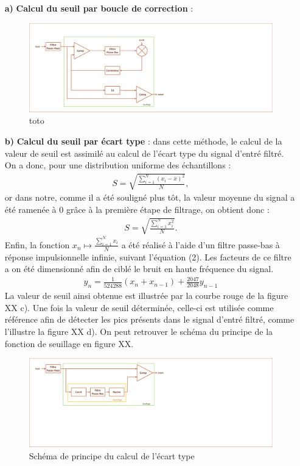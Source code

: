 \documentclass[a4paper,12pt]{article}
\begin{document}
\begin{itemize}
\begin{itemize}
\item[\textbf{a)}] \textbf{Calcul du seuil par boucle de correction} :
\begin{figure}[H]
\centering
\includegraphics[width=\textwidth, keepaspectratio]{chainCedric.pdf}
\caption{toto}
\end{figure}
\item[\textbf{b)}] \textbf{Calcul du seuil par écart type} : dans cette méthode, le calcul de la valeur de seuil est assimilé au calcul de l'écart type du signal d'entré filtré. On a donc, pour une distribution uniforme des échantillons :
\begin{eqnarray*}
S = \sqrt{\frac{\sum^N_{i=1}\left(x_i-\overline{x}\right)^2}{N}},
\end{eqnarray*}
or dans notre, comme il a été souligné plus tôt, la valeur moyenne du signal a été ramenée à 0 grâce à la première étape de filtrage, on obtient donc :
\begin{eqnarray*}
S = \sqrt{\frac{\sum^N_{i=1}x_i^2}{N}}.
\end{eqnarray*}
Enfin, la fonction $x_n\mapsto\frac{\sum^N_{i=1}x_i}{N}$ a été réalisé à l'aide d'un filtre passe-bas à réponse impulsionnelle infinie, suivant l'équation (2). Les facteurs de ce filtre a on été dimensionné afin de ciblé le bruit en haute fréquence du signal.
\begin{eqnarray}
y_n = \frac{1}{524288}\left(x_n + x_{n-1}\right) + \frac{2047}{2048}y_{n-1}
\end{eqnarray}
La valeur de seuil ainsi obtenue est illustrée par la courbe rouge de la figure XX c). Une fois la valeur de seuil déterminée, celle-ci est utilisée comme référence afin de détecter les pics présents dans le signal d'entré filtré, comme
 l'illustre la figure XX d). On peut retrouver le schéma du principe de la fonction de seuillage en figure XX.
\begin{figure}[H]
\centering
\includegraphics[width=\textwidth, keepaspectratio]{chainXavier.pdf}
\caption{Schéma de principe du calcul de l'écart type}
\end{figure}
\end{itemize}
\end{itemize}
\newpage
\end{document}
